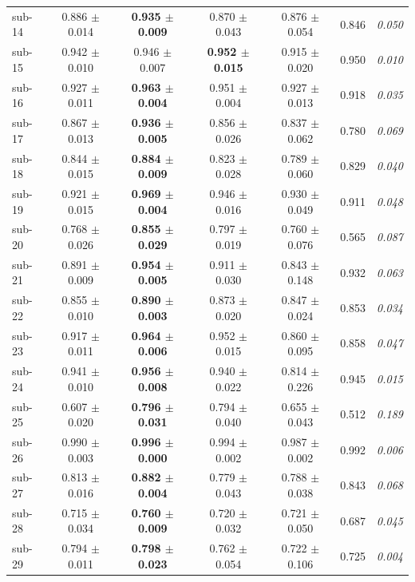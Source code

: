 \begin{table}[t]
\begin{tabular}{lcccccc}
sub-14 & 0.886 $\pm$ 0.014 & \textbf{0.935 $\pm$ 0.009} & 0.870 $\pm$ 0.043 & 0.876 $\pm$ 0.054 & 0.846 & \textit{0.050} \\
sub-15 & 0.942 $\pm$ 0.010 & 0.946 $\pm$ 0.007 & \textbf{0.952 $\pm$ 0.015} & 0.915 $\pm$ 0.020 & 0.950 & \textit{0.010} \\
sub-16 & 0.927 $\pm$ 0.011 & \textbf{0.963 $\pm$ 0.004} & 0.951 $\pm$ 0.004 & 0.927 $\pm$ 0.013 & 0.918 & \textit{0.035} \\
sub-17 & 0.867 $\pm$ 0.013 & \textbf{0.936 $\pm$ 0.005} & 0.856 $\pm$ 0.026 & 0.837 $\pm$ 0.062 & 0.780 & \textit{0.069} \\
sub-18 & 0.844 $\pm$ 0.015 & \textbf{0.884 $\pm$ 0.009} & 0.823 $\pm$ 0.028 & 0.789 $\pm$ 0.060 & 0.829 & \textit{0.040} \\
sub-19 & 0.921 $\pm$ 0.015 & \textbf{0.969 $\pm$ 0.004} & 0.946 $\pm$ 0.016 & 0.930 $\pm$ 0.049 & 0.911 & \textit{0.048} \\
sub-20 & 0.768 $\pm$ 0.026 & \textbf{0.855 $\pm$ 0.029} & 0.797 $\pm$ 0.019 & 0.760 $\pm$ 0.076 & 0.565 & \textit{0.087} \\
sub-21 & 0.891 $\pm$ 0.009 & \textbf{0.954 $\pm$ 0.005} & 0.911 $\pm$ 0.030 & 0.843 $\pm$ 0.148 & 0.932 & \textit{0.063} \\
sub-22 & 0.855 $\pm$ 0.010 & \textbf{0.890 $\pm$ 0.003} & 0.873 $\pm$ 0.020 & 0.847 $\pm$ 0.024 & 0.853 & \textit{0.034} \\
sub-23 & 0.917 $\pm$ 0.011 & \textbf{0.964 $\pm$ 0.006} & 0.952 $\pm$ 0.015 & 0.860 $\pm$ 0.095 & 0.858 & \textit{0.047} \\
sub-24 & 0.941 $\pm$ 0.010 & \textbf{0.956 $\pm$ 0.008} & 0.940 $\pm$ 0.022 & 0.814 $\pm$ 0.226 & 0.945 & \textit{0.015} \\
sub-25 & 0.607 $\pm$ 0.020 & \textbf{0.796 $\pm$ 0.031} & 0.794 $\pm$ 0.040 & 0.655 $\pm$ 0.043 & 0.512 & \textit{0.189} \\
sub-26 & 0.990 $\pm$ 0.003 & \textbf{0.996 $\pm$ 0.000} & 0.994 $\pm$ 0.002 & 0.987 $\pm$ 0.002 & 0.992 & \textit{0.006} \\
sub-27 & 0.813 $\pm$ 0.016 & \textbf{0.882 $\pm$ 0.004} & 0.779 $\pm$ 0.043 & 0.788 $\pm$ 0.038 & 0.843 & \textit{0.068} \\
sub-28 & 0.715 $\pm$ 0.034 & \textbf{0.760 $\pm$ 0.009} & 0.720 $\pm$ 0.032 & 0.721 $\pm$ 0.050 & 0.687 & \textit{0.045} \\
sub-29 & 0.794 $\pm$ 0.011 & \textbf{0.798 $\pm$ 0.023} & 0.762 $\pm$ 0.054 & 0.722 $\pm$ 0.106 & 0.725 & \textit{0.004} \\

\end{tabular}
\end{table}
